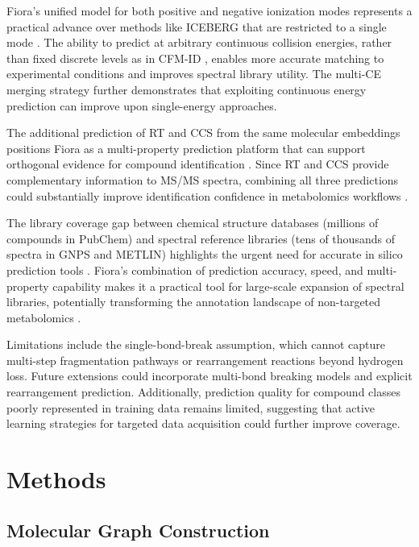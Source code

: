 \documentclass[11pt]{article}
\begin{document}
Fiora's unified model for both positive and negative ionization modes represents a practical advance over methods like ICEBERG that are restricted to a single mode \citep{Goldman2023}. The ability to predict at arbitrary continuous collision energies, rather than fixed discrete levels as in CFM-ID \citep{Allen2015}, enables more accurate matching to experimental conditions and improves spectral library utility. The multi-CE merging strategy further demonstrates that exploiting continuous energy prediction can improve upon single-energy approaches.

The additional prediction of RT and CCS from the same molecular embeddings positions Fiora as a multi-property prediction platform that can support orthogonal evidence for compound identification \citep{Blaenig2022,Zhou2020}. Since RT and CCS provide complementary information to MS/MS spectra, combining all three predictions could substantially improve identification confidence in metabolomics workflows \citep{Tsugawa2015,Duhrkop2019}.

The library coverage gap between chemical structure databases (millions of compounds in PubChem) and spectral reference libraries (tens of thousands of spectra in GNPS and METLIN) highlights the urgent need for accurate in silico prediction tools \citep{Wang2016,Guijas2018}. Fiora's combination of prediction accuracy, speed, and multi-property capability makes it a practical tool for large-scale expansion of spectral libraries, potentially transforming the annotation landscape of non-targeted metabolomics \citep{daSliva2015}.

Limitations include the single-bond-break assumption, which cannot capture multi-step fragmentation pathways or rearrangement reactions beyond hydrogen loss. Future extensions could incorporate multi-bond breaking models and explicit rearrangement prediction. Additionally, prediction quality for compound classes poorly represented in training data remains limited, suggesting that active learning strategies for targeted data acquisition could further improve coverage.

\section{Methods}

\subsection{Molecular Graph Construction}
\end{document}
